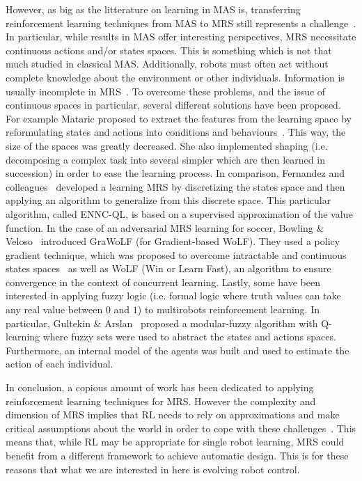   However, as big as the litterature on learning in MAS is, transferring reinforcement learning techniques from MAS to MRS still represents a challenge~\parencite{Yang2005}. In particular, while results in MAS offer interesting perspectives, MRS necessitate continuous actions and/or states spaces. This is something which is not that much studied in classical MAS. Additionally, robots must often act without complete knowledge about the environment or other individuals. Information is usually incomplete in MRS~\parencite{Yang2005, Fernandez2005}. To overcome these problems, and the issue of continuous spaces in particular, several different solutions have been proposed. For example Mataric proposed to extract the features from the learning space by reformulating states and actions into conditions and behaviours~\parencite{Mataric1997}. This way, the size of the spaces was greatly decreased. She also implemented shaping (i.e. decomposing a complex task into several simpler which are then learned in succession) in order to ease the learning process. In comparison, Fernandez and colleagues~\parencite{Fernandez2005} developed a learning MRS by discretizing the states space and then applying an algorithm to generalize from this discrete space. This particular algorithm, called ENNC-QL, is based on a supervised approximation of the value function. In the case of an adversarial MRS learning for soccer, Bowling \& Veloso~\parencite{Bowling2003} introduced GraWoLF (for Gradient-based WoLF). They used a policy gradient technique, which was proposed to overcome intractable and continuous states spaces~\parencite{Sutton2000} as well as WoLF (Win or Learn Fast), an algorithm to ensure convergence in the context of concurrent learning. Lastly, some have been interested in applying fuzzy logic (i.e. formal logic where truth values can take any real value between $0$ and $1$) to multirobots reinforcement learning. In particular, Gultekin \& Arslan~\parencite{Gultekin2002} proposed a modular-fuzzy algorithm with Q-learning where fuzzy sets were used to abstract the states and actions spaces. Furthermore, an internal model of the agents was built and used to estimate the action of each individual. 

  In conclusion, a copious amount of work has been dedicated to applying reinforcement learning techniques for MRS. However the complexity and dimension of MRS implies that RL needs to rely on approximations and make critical assumptions about the world in order to cope with these challenges~\parencite{Yang2005, Parker2008}. This means that, while RL may be appropriate for single robot learning, MRS could benefit from a different framework to achieve automatic design. This is for these reasons that what we are interested in here is evolving robot control.

